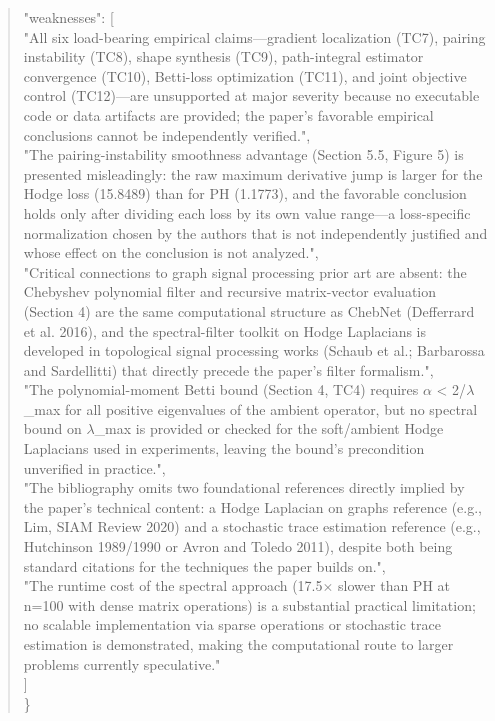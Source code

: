 \documentclass[11pt]{article}
\begin{document}
\begin{quote}
  "weaknesses": [\\
    "All six load-bearing empirical claims---gradient localization (TC7), pairing instability (TC8), shape synthesis (TC9), path-integral estimator convergence (TC10), Betti-loss optimization (TC11), and joint objective control (TC12)---are unsupported at major severity because no executable code or data artifacts are provided; the paper's favorable empirical conclusions cannot be independently verified.",\\
    "The pairing-instability smoothness advantage (Section 5.5, Figure 5) is presented misleadingly: the raw maximum derivative jump is larger for the Hodge loss (15.8489) than for PH (1.1773), and the favorable conclusion holds only after dividing each loss by its own value range---a loss-specific normalization chosen by the authors that is not independently justified and whose effect on the conclusion is not analyzed.",\\
    "Critical connections to graph signal processing prior art are absent: the Chebyshev polynomial filter and recursive matrix-vector evaluation (Section 4) are the same computational structure as ChebNet (Defferrard et al. 2016), and the spectral-filter toolkit on Hodge Laplacians is developed in topological signal processing works (Schaub et al.; Barbarossa and Sardellitti) that directly precede the paper's filter formalism.",\\
    "The polynomial-moment Betti bound (Section 4, TC4) requires \ensuremath{\alpha} < 2/\ensuremath{\lambda}\_max for all positive eigenvalues of the ambient operator, but no spectral bound on \ensuremath{\lambda}\_max is provided or checked for the soft/ambient Hodge Laplacians used in experiments, leaving the bound's precondition unverified in practice.",\\
    "The bibliography omits two foundational references directly implied by the paper's technical content: a Hodge Laplacian on graphs reference (e.g., Lim, SIAM Review 2020) and a stochastic trace estimation reference (e.g., Hutchinson 1989/1990 or Avron and Toledo 2011), despite both being standard citations for the techniques the paper builds on.",\\
    "The runtime cost of the spectral approach (17.5\ensuremath{\times} slower than PH at n=100 with dense matrix operations) is a substantial practical limitation; no scalable implementation via sparse operations or stochastic trace estimation is demonstrated, making the computational route to larger problems currently speculative."\\
  ]\\
\}\\
\end{quote}
\end{document}
